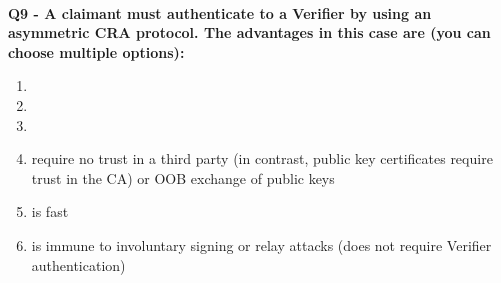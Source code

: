 \textbf{\\Q9 - A claimant must authenticate to a Verifier by using an asymmetric CRA protocol. The advantages in this case are (you can choose multiple options):}
\begin{enumerate}
	\item[A.] 
	\item[B.] 
	\item[C.] 
	\item[D.] require no trust in a third party (in contrast, public key certificates require trust in the CA) or OOB exchange of public keys
	\item[E.] is fast
	\item[F.] is immune to involuntary signing or relay attacks (does not require Verifier authentication)
\end{enumerate}

